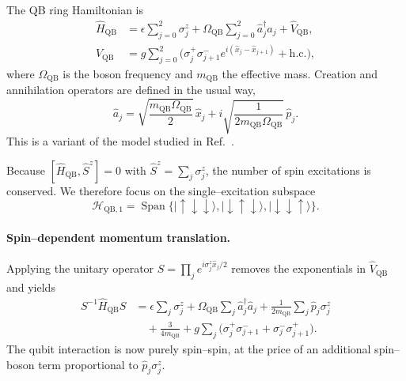 \documentclass[reprint, aps, prx, amsmath, amssymb, longbibliography, superscriptaddress]{revtex4-2}
\begin{document}
The QB ring Hamiltonian is
\begin{equation}
\label{physical-hamiltonian}
  \begin{aligned}
    \hat H_{\text{QB}} &= \epsilon \sum_{j=0}^{2} \sigma_j^z
      + \Omega_{\text{QB}} \sum_{j=0}^{2} \hat a_j^{\dagger} \hat a_j
      + \hat V_{\text{QB}},
      \\
    \hat V_{\text{QB}} &= g \sum_{j=0}^{2}
      \bigl( \sigma_j^{+} \sigma_{j+1}^{-}
      e^{ i ( \hat x_j - \hat x_{j+1} ) } + \text{h.c.} \bigr),
  \end{aligned}
\end{equation}
where $\Omega_{\text{QB}}$ is the boson frequency and $m_{\text{QB}}$ the
effective mass.  Creation and annihilation operators are defined in the usual
way,
\begin{equation}
  \hat a_j = \sqrt{\frac{m_{\text{QB}} \Omega_{\text{QB}}}{2}}\, \hat x_j
           + i \sqrt{ \frac{1}{2 m_{\text{QB}} \Omega_{\text{QB}}} }\, \hat p_j.
\end{equation}
This is a variant of the model studied in
Ref.~\cite{sedov_chiral_2020}.

Because $[ \hat H_{\text{QB}}, \hat S^z ] = 0$ with $\hat S^z = \sum_j
\sigma_j^z$, the number of spin excitations is conserved.  We therefore focus
on the single--excitation subspace
\begin{equation}
  \mathcal H_{\text{QB},1} = \operatorname{Span}\bigl\{ |
    \uparrow\downarrow\downarrow\rangle,
    |\downarrow\uparrow\downarrow\rangle,
    |\downarrow\downarrow\uparrow\rangle \bigr\}.
\end{equation}

\paragraph{Spin--dependent momentum translation.}
Applying the unitary operator
$S = \prod_j e^{ i \sigma_j^z \hat x_j / 2 }$ removes the exponentials in
$\hat V_{\text{QB}}$ and yields
\begin{equation}
\label{after-momentum-translation}
  \begin{aligned}
    S^{-1} \hat H_{\text{QB}} S &= \epsilon \sum_{j} \sigma_j^z
      + \Omega_{\text{QB}} \sum_j \hat a_j^{\dagger} \hat a_j
      + \frac{1}{2 m_{\text{QB}}} \sum_j \hat p_j \sigma_j^z
      \\
      &\quad + \frac{3}{4 m_{\text{QB}}}
      + g \sum_{j}
        \bigl( \sigma_j^{+} \sigma_{j+1}^{-} + \sigma_j^{-} \sigma_{j+1}^{+} \bigr).
  \end{aligned}
\end{equation}
The qubit interaction is now purely spin--spin, at the price of an additional
spin--boson term proportional to $\hat p_j \sigma_j^z$.
\end{document}

